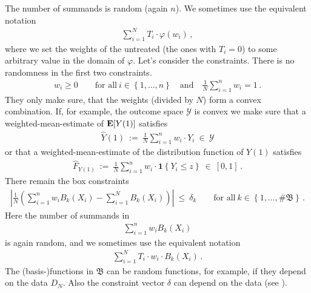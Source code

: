 The number of summands is random (again $n$). We sometimes use the equivalent notation
\begin{gather*}
    \sum_{i = 1}^{N} 
    T_i
    \cdot
    \varphi(w_i)
    \,,
\end{gather*}
where we set the weights of the untreated (the ones with $T_i=0$) to some arbitrary value in the domain of $\varphi$.
Let's consider the constraints. There is no randomness in the first two constraints.
\begin{gather*}
    w_i 
    \ge
    0
    \qquad
    \text{for all}\ 
    i \in \left\{ 1, \ldots, n \right\}
    \quad
    \text{and}
    \quad
    \frac{1}{N}
    \sum_{i=1}^{n} 
    w_i
    =1
    \,.
\end{gather*}
They only make sure, that the weights (divided by $N$) form a convex combination.
If, for example, the outcome space $\mathcal{Y}$ is convex we make sure that a weighted-mean-estimate of $\mathbf{E}[Y(1)]$ satisfies
\begin{gather*}
  \widehat{Y}(1) 
  \ 
  :=
  \ 
  \frac{1}{N}
  \sum_{i=1}^{n} 
  w_i\cdot Y_i
  \ 
  \in
  \ 
  \mathcal{Y}
\end{gather*}
or that a weighted-mean-estimate of the distribution function of $Y(1)$ satisfies
\begin{gather*}
  \widehat{F}_{Y(1)} 
  \ 
  :=
  \ 
  \frac{1}{N}
  \sum_{i=1}^{n} 
  w_i\cdot \mathbf{1}\left\{ Y_i\le z \right\}
  \ 
  \in
  \ 
  [0,1]
  \,.
\end{gather*}
There remain the box constraints
\begin{gather*}
    \left| 
      \frac{1}{N} 
      \left( 
      \sum_{i = 1}^{n} 
      w_i
      B_k(X_i)
      -
      \sum_{i=1}^{N} 
      B_k(X_i)
      \right)
    \right|
    \ 
    \le 
    \ 
    \delta_k
    \qquad
    \text{for all}\ 
    k \in \left\{ 1, \ldots, \# \mathfrak{B} \right\}
    \,.
\end{gather*}
Here the number of summands in
\begin{gather*}
      \sum_{i = 1}^{n} 
      w_i
      B_k(X_i)
\end{gather*}
is again random, and we sometimes use the equivalent notation
\begin{gather*}
      \sum_{i = 1}^{N} 
      T_i
      \cdot
      w_i
      \cdot
      B_k(X_i)
      \,.
\end{gather*}
The (basis-)functions in $\mathfrak{B}$ can be random functions, for example, if they depend on the data $D_N$.
Also the constraint vector $\delta$ can depend on the data (see \cite[Algorithm~1 on page 11]{Wang2019}).
